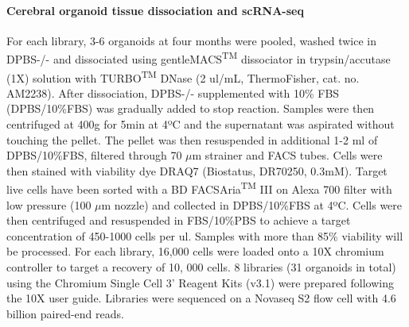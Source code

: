 \paragraph{Cerebral organoid tissue dissociation and scRNA-seq}
For each library, 3-6 organoids at four months were pooled, washed twice in DPBS-/- and dissociated using gentleMACS\textsuperscript{TM} dissociator in trypsin/accutase (1X) solution with TURBO\textsuperscript{TM} DNase (2 ul/mL, ThermoFisher, cat. no. AM2238). After dissociation, DPBS-/- supplemented with 10\% FBS (DPBS/10\%FBS) was gradually added to stop reaction. Samples were then centrifuged at 400g for 5min at 4ºC and the supernatant was aspirated without touching the pellet. The pellet was then resuspended in additional 1-2 ml of DPBS/10\%FBS, filtered through 70 $\mu$m strainer and FACS tubes. Cells were then stained with viability dye DRAQ7 (Biostatus, DR70250, 0.3mM). Target live cells have been sorted with a BD FACSAria\textsuperscript{TM} III on Alexa 700 filter with low pressure (100 $\mu$m nozzle) and collected in DPBS/10\%FBS at 4ºC. Cells were then centrifuged and resuspended in FBS/10\%PBS to achieve a target concentration of 450-1000 cells per ul. Samples with more than 85\% viability will be processed. For each library, 16,000 cells were loaded onto a 10X chromium controller to target a recovery of 10, 000 cells. 8 libraries (31 organoids in total) using the Chromium Single Cell 3' Reagent Kits (v3.1) were prepared following the 10X user guide. Libraries were sequenced on a Novaseq S2 flow cell with 4.6 billion paired-end reads.


